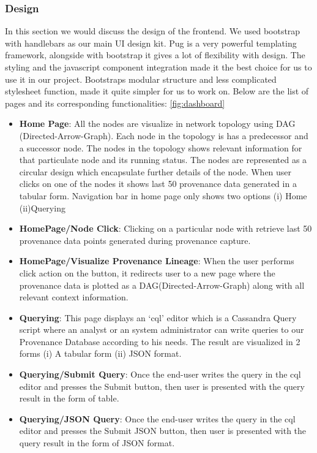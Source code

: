 \subsubsection{Design}
In this section we would discuss the design of the frontend. We used bootstrap with handlebars as our main UI design kit. Pug is a very powerful templating framework, alongside with bootstrap it gives a lot of flexibility with design. The styling and the javascript component integration made it the best choice for us to use it in our project. Bootstraps modular structure and less complicated stylesheet function, made it quite simpler for us to work on. Below are the list of pages and its corresponding functionalities: \ref{fig:dashboard}

\begin{itemize}
    \item \textbf{Home Page}: All the nodes are visualize in network topology using DAG (Directed-Arrow-Graph). Each node in the topology is has a predecessor and a successor node. The nodes in the topology shows relevant information for that particulate node and its running status. The nodes are represented as a circular design which encapsulate further details of the node. When user clicks on one of the nodes it shows last 50 provenance data generated in a tabular form. Navigation bar in home page only
    shows two options (i) Home (ii)Querying
    \item \textbf{HomePage/Node Click}: Clicking on a particular node with retrieve last 50 provenance data points generated during provenance capture.
    \item \textbf{HomePage/Visualize Provenance Lineage}: When the user performs click action on the button, it redirects user to a new page where the provenance data is plotted as a DAG(Directed-Arrow-Graph) along with all relevant context information.
    \item \textbf{Querying}: This page displays an `cql' editor which is a Cassandra Query script where an analyst or an system administrator can write queries to our Provenance Database according to his needs. The result are visualized in 2 forms (i) A tabular form (ii) JSON format.
    \item \textbf{Querying/Submit Query}: Once the end-user writes the query in the cql editor and presses the Submit button, then user is presented with the query result in the form of table.
    \item \textbf{Querying/JSON Query}: Once the end-user writes the query in the cql editor and presses the Submit JSON button, then user is presented with the query result in the form of JSON format.
\end{itemize}


